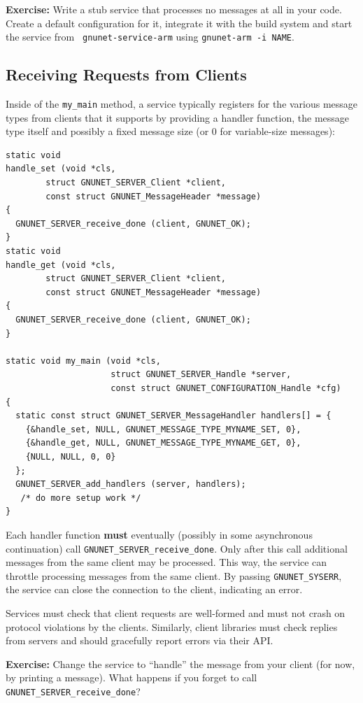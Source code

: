 \documentclass[10pt]{article}
\newcommand{\exercise}[1]{\noindent\begin{boxedminipage}{\textwidth}{\bf Exercise:} #1 \end{boxedminipage}}
\begin{document}
\exercise{Write a stub service that processes no messages at all
in your code.  Create a default configuration for it, integrate it
with the build system and start the service from {\tt
  gnunet-service-arm} using {\tt gnunet-arm -i NAME}.}


\subsection{Receiving Requests from Clients}

Inside of the {\tt my\_main} method, a service typically registers for
the various message types from clients that it supports by providing
a handler function, the message type itself and possibly a fixed
message size (or 0 for variable-size messages):

\lstset{language=c}
\begin{lstlisting}
static void
handle_set (void *cls,
	    struct GNUNET_SERVER_Client *client,
	    const struct GNUNET_MessageHeader *message)
{
  GNUNET_SERVER_receive_done (client, GNUNET_OK);
}
static void
handle_get (void *cls,
	    struct GNUNET_SERVER_Client *client,
	    const struct GNUNET_MessageHeader *message)
{
  GNUNET_SERVER_receive_done (client, GNUNET_OK);
}

static void my_main (void *cls,
                     struct GNUNET_SERVER_Handle *server,
                     const struct GNUNET_CONFIGURATION_Handle *cfg)
{
  static const struct GNUNET_SERVER_MessageHandler handlers[] = {
    {&handle_set, NULL, GNUNET_MESSAGE_TYPE_MYNAME_SET, 0},
    {&handle_get, NULL, GNUNET_MESSAGE_TYPE_MYNAME_GET, 0},
    {NULL, NULL, 0, 0}
  };
  GNUNET_SERVER_add_handlers (server, handlers);
   /* do more setup work */
}
\end{lstlisting}

Each handler function {\bf must} eventually (possibly in some
asynchronous continuation) call {\tt GNUNET\_SERVER\_receive\_done}.
Only after this call additional messages from the same client may
be processed. This way, the service can throttle processing messages
from the same client.  By passing {\tt GNUNET\_SYSERR}, the service
can close the connection to the client, indicating an error.

Services must check that client requests are well-formed and must not
crash on protocol violations by the clients.  Similarly, client
libraries must check replies from servers and should gracefully report
errors via their API.


\exercise{Change the service to ``handle'' the message from your
client (for now, by printing a message).  What happens if you
forget to call {\tt GNUNET\_SERVER\_receive\_done}?}
\end{document}
